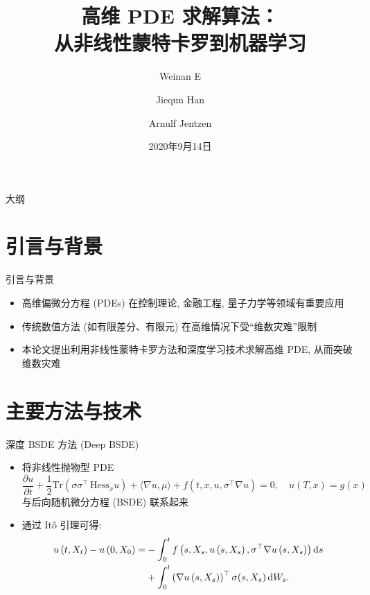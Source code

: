 \documentclass[aspectratio=169]{beamer}
\title{高维 PDE 求解算法：\\从非线性蒙特卡罗到机器学习}
\author{Weinan E \and Jiequn Han \and Arnulf Jentzen}
\date{2020年9月14日}
\def\dif{\mathinner{\mathrm{d}}\hphantom{\mskip-\thinmuskip}}
\begin{document}
	\begin{frame}
		\titlepage
	\end{frame}

	\begin{frame}{大纲}
		\tableofcontents
	\end{frame}

	\section{引言与背景}
	\begin{frame}{引言与背景}
		\begin{itemize}
			\item 高维偏微分方程 (PDEs) 在控制理论, 金融工程, 量子力学等领域有重要应用
			\item 传统数值方法 (如有限差分、有限元) 在高维情况下受``维数灾难''限制
			\item 本论文提出利用非线性蒙特卡罗方法和深度学习技术求解高维 PDE, 从而突破维数灾难
		\end{itemize}
	\end{frame}

	\section{主要方法与技术}
	\begin{frame}{深度 BSDE 方法 (Deep BSDE)}
		\begin{itemize}
			\item 将非线性抛物型 PDE
				\begin{equation*}
					\frac{\partial u}{\partial t} + \frac{1}{2} \mathrm{Tr}\left(\sigma\sigma^{\top}\,\mathrm{Hess}_x u\right) + \langle\nabla u, \mu\rangle + f\left(t, x, u, \sigma^{\top} \nabla u\right)=0, \quad u\left(T,x\right)=g\left(x\right)
				\end{equation*}
				与后向随机微分方程 (BSDE) 联系起来
			\item 通过 It\^{o} 引理可得:
				\begin{equation*}
					\begin{aligned}
						u\left(t, X_{t}\right) - u\left(0, X_{0}\right) = &-\int_{0}^{t} f\left(s, X_{s}, u\left(s, X_s\right), \sigma^{\top}\nabla u\left(s, X_{s}\right)\right) \dif s \\
						&+ \int_{0}^{t} \left(\nabla u\left(s, X_{s}\right)\right)^{\top}\sigma(s, X_{s}) \dif W_{s}.
					\end{aligned}
				\end{equation*}
		\end{itemize}
	\end{frame}
\end{document}
